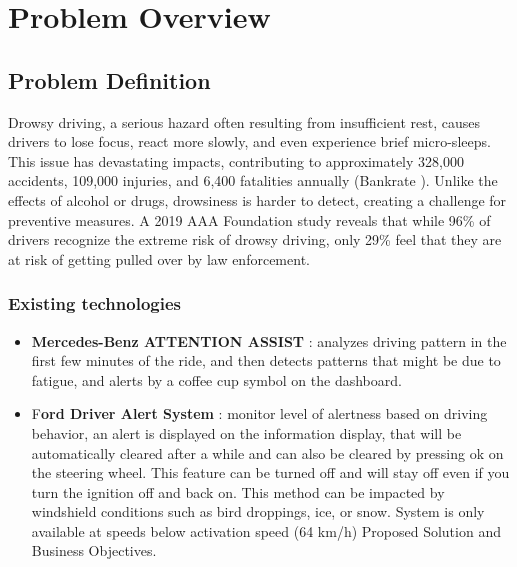 \documentclass{modeleRapport}
\begin{document}
\fairepagedegarde
\fairetabledesmatieres


\section{Problem Overview}

\subsection{Problem Definition}

Drowsy driving, a serious hazard often resulting from insufficient rest, causes drivers to lose focus, 
react more slowly, and even experience brief micro-sleeps. This issue has devastating impacts, contributing to 
approximately 328,000 accidents, 109,000 injuries, and 6,400 fatalities annually (Bankrate \cite{Bankrate}). 
Unlike the effects of alcohol or drugs, drowsiness is harder to detect, creating a challenge for preventive measures. 
A 2019 AAA Foundation \cite{AAAFoundation} study reveals that while 96\% of drivers recognize the extreme risk of drowsy 
driving, only 29\% feel that they are at risk of getting pulled over by law enforcement. 


\subsubsection{Existing technologies}

\begin{itemize}
\item \textbf{Mercedes-Benz ATTENTION ASSIST} \cite{Mercedes}: analyzes driving pattern in the first few minutes of the 
ride, and then detects patterns that might be due to fatigue, and alerts by a coffee cup symbol on the dashboard.  

\item F\textbf{ord Driver Alert System} \cite{Ford}: monitor level of alertness based on driving behavior, an alert is 
displayed on the information display, that will be automatically cleared after a while and can also be cleared by pressing 
ok on the steering wheel. This feature can be turned off and will stay off even if you turn the ignition off and back on. 
This method can be impacted by windshield conditions such as bird droppings, ice, or snow. System is only available at speeds 
below activation speed (64 km/h) Proposed Solution and Business Objectives. 
\end{itemize}
\end{document}
